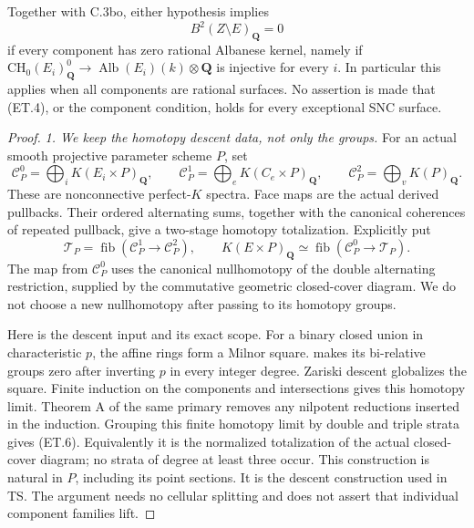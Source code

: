 Together with C.3bo, either hypothesis implies
\begin{equation}
 B^2(Z\setminus E)_{\mathbf Q}=0                         \tag{ET.5}
\end{equation}
if every component has zero rational Albanese kernel, namely if
$\mathrm{CH}_0(E_i)^0_{\mathbf Q}\to
\operatorname{Alb}(E_i)(k)\otimes\mathbf Q$ is injective for every $i$.
In particular this applies when all components are rational surfaces.
No assertion is made that (ET.4), or the component condition, holds for
every exceptional SNC surface.

\begin{proof}
\emph{1. We keep the homotopy descent data, not only the groups.}
For an actual smooth projective parameter scheme $P$, set
\[
 \mathcal C_P^0=\bigoplus_i K(E_i\times P)_{\mathbf Q},\qquad
 \mathcal C_P^1=\bigoplus_e K(C_e\times P)_{\mathbf Q},\qquad
 \mathcal C_P^2=\bigoplus_v K(P)_{\mathbf Q}.
\]
These are nonconnective perfect-$K$ spectra. Face maps are the actual
derived pullbacks. Their ordered alternating sums, together with the
canonical coherences of repeated pullback, give a two-stage homotopy
totalization. Explicitly put
\begin{equation}
 \mathcal T_P=\operatorname{fib}
       (\mathcal C_P^1\longrightarrow\mathcal C_P^2),
 \qquad
 K(E\times P)_{\mathbf Q}\simeq
       \operatorname{fib}(\mathcal C_P^0\longrightarrow\mathcal T_P).
                                                        \tag{ET.6}
\end{equation}
The map from $\mathcal C_P^0$ uses the canonical nullhomotopy of the
double alternating restriction, supplied by the commutative geometric
closed-cover diagram. We do not choose a new nullhomotopy after passing
to its homotopy groups.

Here is the descent input and its exact scope. For a binary closed union
in characteristic $p$, the affine rings form a Milnor square.
\citet[Theorem C, p.~30]{rootGeisserHesselholt2011} makes its bi-relative
groups zero after inverting $p$ in every integer degree. Zariski descent
\citep[Theorem 8.1]{D_ThomasonTrobaugh1990} globalizes the square.
Finite induction on the components and intersections gives this homotopy
limit. Theorem A of the same primary removes any nilpotent reductions
inserted in the induction.
Grouping this finite homotopy limit by double and triple strata gives
(ET.6). Equivalently it is the normalized totalization of the actual
closed-cover diagram; no strata of degree at least three occur.
This construction is natural in $P$, including its point sections.
It is the descent construction used in TS. The argument needs no cellular
splitting and does not assert that individual component families lift.


\end{proof}
